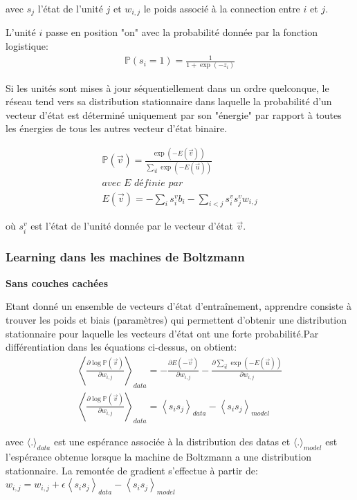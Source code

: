 \documentclass{article}
\theoremstyle{definition}
\begin{document}
\noindent avec $s_j$ l'état de l'unité $j$ et $w_{i,j}$ le poids associé à la connection entre $i$ et $j$.

\noindent L'unité $i$ passe en position "on" avec la probabilité donnée par la fonction logistique:
\begin{align*}
\mathbb{P}(s_i=1)=\frac{1}{1+\exp(-z_i)}
\end{align*}

\noindent Si les unités sont mises à jour séquentiellement dans un ordre quelconque, le réseau tend vers sa distribution stationnaire dans laquelle la probabilité d'un vecteur d'état est déterminé uniquement par son "énergie" par rapport à toutes les énergies de tous les autres vecteur d'état binaire.

\begin{align*}
\mathbb{P}(\vec{v})=\frac{\exp(-E(\vec{v}))}{\sum_{\vec{u}} \exp(-E(\vec{u}))}\\
\textit{avec E définie par}\\
E(\vec{v})=-\sum_i s_i^{v} b_i-\sum_{i < j} s_i^{v} s_j^{v} w_{i,j}
\end{align*}

\noindent où $s_i^v$ est l'état de l'unité donnée par le vecteur d'état $\vec{v}$.

\subsubsection{Learning dans les machines de Boltzmann}

\textbf{Sans couches cachées}

\noindent Etant donné un ensemble de vecteurs d'état d'entraînement, apprendre consiste à trouver les poids et biais (paramètres) qui permettent d'obtenir une distribution stationnaire pour laquelle les vecteurs d'état ont une forte probabilité.Par différentiation dans les équations ci-dessus, on obtient:
\begin{align*}
\left\langle\frac{\partial \log \mathbb{P}(\vec{v})}{\partial w_{i,j}}\right\rangle_{data}=-\frac{\partial E(-\vec{v})}{\partial w_{i,j}}-\frac{\partial\sum_{\vec{u}} \exp(-E(\vec{u}))}{\partial w_{i,j}}\\
\left\langle\frac{\partial \log \mathbb{P}(\vec{v})}{\partial w_{i,j}}\right\rangle_{data}=\left\langle s_is_j\right\rangle_{data}-\left\langle s_is_j\right\rangle_{model}
\end{align*}

\noindent avec $\langle.\rangle_{data}$ est une espérance associée à la distribution des datas et $\langle.\rangle_{model}$ est l'espérance obtenue lorsque la machine de Boltzmann a une distribution stationnaire. La remontée de gradient s'effectue à partir de:
$w_{i,j}=w_{i,j}+\epsilon \left\langle s_is_j\right\rangle_{data}-\left\langle s_is_j\right\rangle_{model}$
\end{document}
